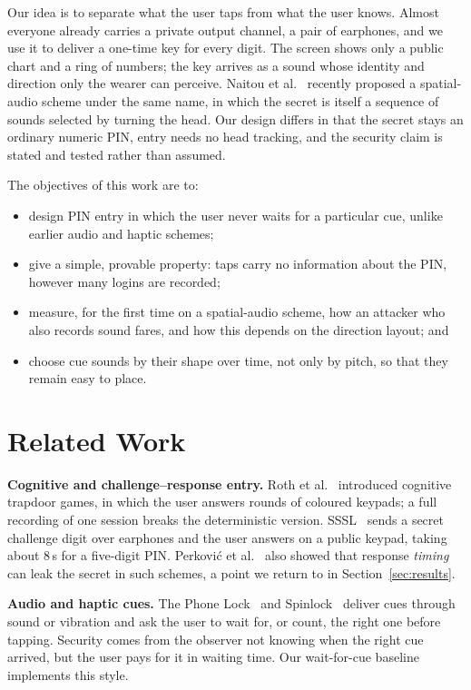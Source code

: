 \documentclass[conference]{IEEEtran}
\begin{document}
Our idea is to separate what the user taps from what the user knows. Almost everyone already carries a
private output channel, a pair of earphones, and we use it to deliver a one-time key for every digit.
The screen shows only a public chart and a ring of numbers; the key arrives as a sound whose identity
and direction only the wearer can perceive. Naitou et al.~\cite{naitou2026audiopin} recently proposed a
spatial-audio scheme under the same name, in which the secret is itself a sequence of sounds selected by
turning the head. Our design differs in that the secret stays an ordinary numeric PIN, entry needs no
head tracking, and the security claim is stated and tested rather than assumed.

The objectives of this work are to:
\begin{itemize}
\item design PIN entry in which the user never waits for a particular cue, unlike earlier audio and
haptic schemes;
\item give a simple, provable property: taps carry no information about the PIN, however many
logins are recorded;
\item measure, for the first time on a spatial-audio scheme, how an attacker who also records sound
fares, and how this depends on the direction layout; and
\item choose cue sounds by their shape over time, not only by pitch, so that they remain easy to place.
\end{itemize}

\section{Related Work}
\textbf{Cognitive and challenge--response entry.} Roth et al.~\cite{roth2004pin} introduced cognitive
trapdoor games, in which the user answers rounds of coloured keypads; a full recording of one
session breaks the deterministic version. SSSL~\cite{perkovic2010sssl} sends a secret challenge digit
over earphones and the user answers on a public keypad, taking about 8\,s for a five-digit PIN.
Perkovi\'c et al.~\cite{perkovic2010partially} also showed that response \emph{timing} can leak the
secret in such schemes, a point we return to in Section~\ref{sec:results}.

\textbf{Audio and haptic cues.} The Phone Lock~\cite{bianchi2011phonelock} and
Spinlock~\cite{bianchi2011spinlock} deliver cues through sound or vibration and ask the user to wait for,
or count, the right one before tapping. Security comes from the observer not knowing when the right cue
arrived, but the user pays for it in waiting time. Our wait-for-cue baseline implements this style.
\end{document}
